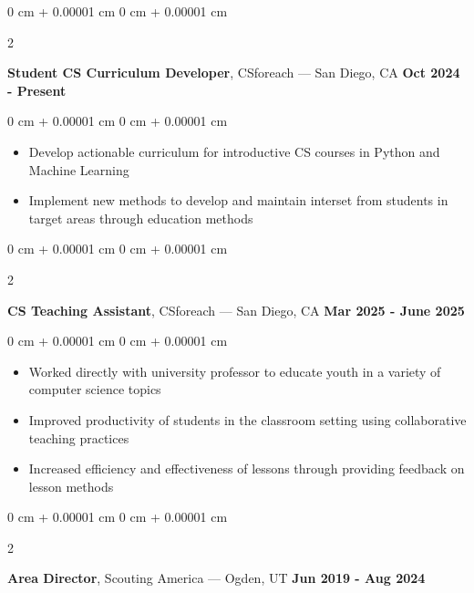 \documentclass[10pt, letterpaper]{article}
\newenvironment{highlights}{
    \begin{itemize}[
        topsep=0.10 cm,
        parsep=0.10 cm,
        partopsep=0pt,
        itemsep=0pt,
        leftmargin=0 cm + 10pt
    ]
}{
    \end{itemize}
} %
\newenvironment{onecolentry}{
    \begin{adjustwidth}{
        0 cm + 0.00001 cm
    }{
        0 cm + 0.00001 cm
    }
}{
    \end{adjustwidth}
} %
\newenvironment{twocolentry}[2][]{
    \onecolentry%
    \def\secondColumn{#2}
    \setcolumnwidth{\fill, 4.5 cm}
    \begin{paracol}{2}
}{
    \switchcolumn\raggedleft\secondColumn%
    \end{paracol}
    \endonecolentry%
} %
\begin{document}
        \vspace{0.2 cm}

        \begin{twocolentry}{
            {\color{secondaryColor}\textbf{Oct 2024 - Present}}
        }
            \textbf{Student CS Curriculum Developer}, CSforeach --- San Diego, CA\end{twocolentry}

        \vspace{0.10 cm}
        \begin{onecolentry}
            \begin{highlights}
                \item Develop actionable curriculum for introductive CS courses in Python and Machine Learning
                \item Implement new methods to develop and maintain interset from students in target areas through education methods
            \end{highlights}
        \end{onecolentry}


        \vspace{0.2 cm}

        \begin{twocolentry}{
            {\color{secondaryColor}\textbf{Mar 2025 - June 2025}}
        }
            \textbf{CS Teaching Assistant}, CSforeach --- San Diego, CA\end{twocolentry}

        \vspace{0.10 cm}
        \begin{onecolentry}
            \begin{highlights}
                \item Worked directly with university professor to educate youth in a variety of computer science topics
                \item Improved productivity of students in the classroom setting using collaborative teaching practices
                \item Increased efficiency and effectiveness of lessons through providing feedback on lesson methods
            \end{highlights}
        \end{onecolentry}
        
        \vspace{0.2 cm}


        \begin{twocolentry}{
            {\color{secondaryColor}\textbf{Jun 2019 - Aug 2024}}
        }
            \textbf{Area Director}, Scouting America --- Ogden, UT\end{twocolentry}
\end{document}
